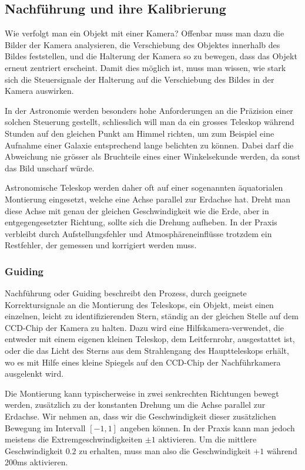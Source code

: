 %
%
%
\subsection{Nachführung und ihre Kalibrierung}
Wie verfolgt man ein Objekt mit einer Kamera?
Offenbar muss man dazu
die Bilder der Kamera analysieren, die Verschiebung des Objektes innerhalb
des Bildes feststellen, und die Halterung der Kamera so zu bewegen,
dass das Objekt erneut zentriert erscheint.
Damit dies möglich ist, muss man wissen, wie stark sich die Steuersignale
der Halterung auf die Verschiebung des Bildes in der Kamera auswirken.

In der Astronomie werden besonders hohe Anforderungen an die Präzision
einer solchen Steuerung gestellt, schliesslich will man da ein grosses
Teleskop während Stunden auf den gleichen Punkt am Himmel richten, um
zum Beispiel eine Aufnahme einer Galaxie entsprechend lange belichten
zu können.
Dabei darf die Abweichung nie grösser als Bruchteile eines
einer Winkelsekunde werden, da sonst das Bild unscharf würde.

Astronomische Teleskop werden daher oft auf einer sogenannten
äquatorialen Montierung eingesetzt, welche eine Achse parallel
zur Erdachse hat. Dreht man diese Achse mit genau der gleichen
Geschwindigkeit wie die Erde, aber in entgegengesetzter Richtung,
sollte sich die Drehung aufheben. In der Praxis verbleibt durch
Aufstellungsfehler und Atmosphäreneinflüsse trotzdem ein Restfehler,
der gemessen und korrigiert werden muss.

\subsubsection{Guiding}
Nachführung oder Guiding beschreibt den Prozess, durch geeignete
Korrektursignale an die Montierung des Teleskops, ein Objekt, meist
einen einzelnen, leicht zu identifizierenden Stern, ständig an der
gleichen Stelle auf dem CCD-Chip der Kamera zu halten. Dazu wird
eine Hilfskamera-verwendet, die entweder mit einem eigenen kleinen
Teleskop, dem Leitfernrohr, ausgestattet ist, oder die das Licht
des Sterns aus dem Strahlengang des Hauptteleskops erhält, wo
es mit Hilfe eines kleine Spiegels auf den CCD-Chip der Nachführkamera
ausgelenkt wird.

Die Montierung kann typischerweise in zwei senkrechten Richtungen
bewegt werden, zusätzlich zu der konstanten Drehung um die
Achse parallel zur Erdachse.
Wir nehmen an, dass wir die Geschwindigkeit
dieser zusätzlichen Bewegung im Intervall $[-1,1]$ angeben können.
In der Praxis kann man jedoch meistens die Extremgeschwindigkeiten
$\pm 1$ aktivieren. Um die mittlere Geschwindigkeit $0.2$ zu erhalten,
muss man also die Geschwindigkeit $+1$ während 200ms aktivieren.

